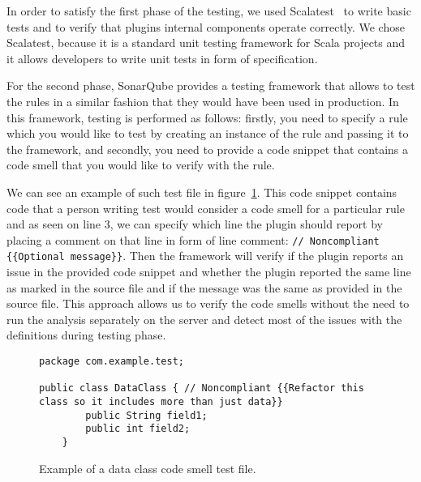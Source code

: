 In order to satisfy the first phase of the testing, we used Scalatest~\cite{scalatest} to write basic tests and to verify
that plugins internal components operate correctly.
We chose Scalatest, because it is a standard unit testing framework for Scala projects and it allows developers
to write unit tests in form of specification.

For the second phase, SonarQube provides a testing framework that allows to test the rules in a similar fashion that
they would have been used in production.
In this framework, testing is performed as follows: firstly, you need to specify a rule which you would like to test by
creating an instance of the rule and passing it to the framework, and secondly, you need to provide a code snippet that
contains a code smell that you would like to verify with the rule.

We can see an example of such test file in figure~\ref{data_class_example}.
This code snippet contains code that a person writing test would consider a code smell for a particular rule
and as seen on line 3, we can specify which line the plugin should report by placing a comment on that line in form of line comment:
\verb|// Noncompliant {{Optional message}}|.
Then the framework will verify if the plugin reports an issue in the provided code snippet and whether the plugin reported
the same line as marked in the source file and if the message was the same as provided in the source file.
This approach allows us to verify the code smells without the need to run the analysis separately on the server and
detect most of the issues with the definitions during testing phase.

\begin{figure} [htb]
    \begin{lstlisting}
package com.example.test;

public class DataClass { // Noncompliant {{Refactor this class so it includes more than just data}}
        public String field1;
        public int field2;
    }
    \end{lstlisting}
    \caption{Example of a data class code smell test file.}
    \label{data_class_example}
\end{figure}
